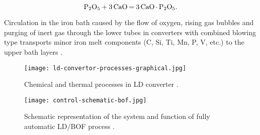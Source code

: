 \begin{equation}
\ce{P2O5 + 3CaO = 3CaO.P2O5}.
\end{equation}

Circulation in the iron bath caused by the flow of oxygen, rising gas bubbles and purging of inert gas through the lower tubes in converters with combined blowing type transports minor iron melt components (C, Si, Ti, Mn, P, V, etc.) to the upper bath layers \cite{Jalkanen2006}. 

\begin{figure}[h!]
	\centering
	\texttt{[image: ld-convertor-processes-graphical.jpg]}
	\caption{Chemical and thermal processes in LD converter \citep{Jalkanen2006}.}
	\label{o:25}
\end{figure}

\begin{figure}[h!]
	\centering
	\texttt{[image: control-schematic-bof.jpg]}
	\caption{Schematic representation of the system and function of fully automatic LD/BOF process \citep{Turkdogan1996}.}
	\label{o:i31}
\end{figure}